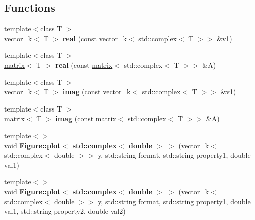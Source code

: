 \subsection*{Functions}
\begin{DoxyCompactItemize}
\item 
\hypertarget{namespacekeycpp_a5b72a83172512bb554f5e443b9b366bd}{{\footnotesize template$<$class T $>$ }\\\hyperlink{classkeycpp_1_1vector__k}{vector\-\_\-k}$<$ T $>$ {\bfseries real} (const \hyperlink{classkeycpp_1_1vector__k}{vector\-\_\-k}$<$ std\-::complex$<$ T $>$$>$ \&v1)}\label{namespacekeycpp_a5b72a83172512bb554f5e443b9b366bd}

\item 
\hypertarget{namespacekeycpp_a61efb014b42cd8b02a81b4520c41ab2c}{{\footnotesize template$<$class T $>$ }\\\hyperlink{classkeycpp_1_1matrix}{matrix}$<$ T $>$ {\bfseries real} (const \hyperlink{classkeycpp_1_1matrix}{matrix}$<$ std\-::complex$<$ T $>$$>$ \&A)}\label{namespacekeycpp_a61efb014b42cd8b02a81b4520c41ab2c}

\item 
\hypertarget{namespacekeycpp_a752e14fae8ca75a5702c89207a7cd983}{{\footnotesize template$<$class T $>$ }\\\hyperlink{classkeycpp_1_1vector__k}{vector\-\_\-k}$<$ T $>$ {\bfseries imag} (const \hyperlink{classkeycpp_1_1vector__k}{vector\-\_\-k}$<$ std\-::complex$<$ T $>$$>$ \&v1)}\label{namespacekeycpp_a752e14fae8ca75a5702c89207a7cd983}

\item 
\hypertarget{namespacekeycpp_ad902a14fdaa4b744a8a11220f5be0161}{{\footnotesize template$<$class T $>$ }\\\hyperlink{classkeycpp_1_1matrix}{matrix}$<$ T $>$ {\bfseries imag} (const \hyperlink{classkeycpp_1_1matrix}{matrix}$<$ std\-::complex$<$ T $>$$>$ \&A)}\label{namespacekeycpp_ad902a14fdaa4b744a8a11220f5be0161}

\item 
\hypertarget{namespacekeycpp_a0bf7cb9cbc44ac0b9e37ea84a7c460cf}{{\footnotesize template$<$$>$ }\\void {\bfseries Figure\-::plot$<$ std\-::complex$<$ double $>$ $>$} (\hyperlink{classkeycpp_1_1vector__k}{vector\-\_\-k}$<$ std\-::complex$<$ double $>$$>$ y, std\-::string format, std\-::string property1, double val1)}\label{namespacekeycpp_a0bf7cb9cbc44ac0b9e37ea84a7c460cf}

\item 
\hypertarget{namespacekeycpp_a0fd09e7b19e9c22430bb0e1b00a33067}{{\footnotesize template$<$$>$ }\\void {\bfseries Figure\-::plot$<$ std\-::complex$<$ double $>$ $>$} (\hyperlink{classkeycpp_1_1vector__k}{vector\-\_\-k}$<$ std\-::complex$<$ double $>$$>$ y, std\-::string format, std\-::string property1, double val1, std\-::string property2, double val2)}\label{namespacekeycpp_a0fd09e7b19e9c22430bb0e1b00a33067}


\end{DoxyCompactItemize}
